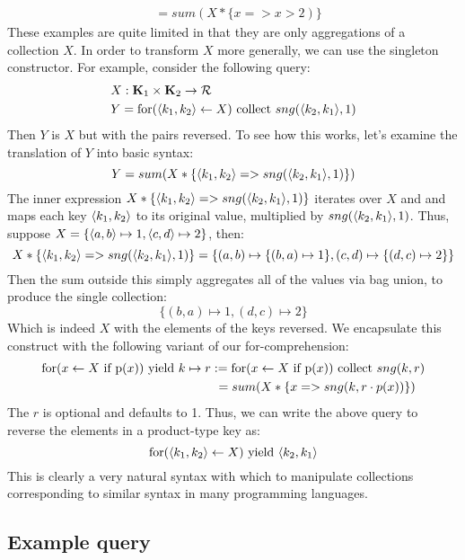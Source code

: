{{{{\begin{equation*}
\begin{split}
&=sum(X * \{x => x > 2) \}
\end{split}
\end{equation*}
These examples are quite limited in that they are only aggregations of a collection $X$. In order to transform $X$ more generally, we can use the singleton constructor. For example, consider the following query:
\begin{equation*}
\begin{split}
&X: \mathbf{K}_1 \times \mathbf{K}_2 \rightarrow \mathcal{R} \\
&Y = \textrm{for}(\langle k_1, k_2 \rangle \leftarrow X) \textrm{ collect } sng(\langle k_2, k_1 \rangle, 1)
\end{split}
\end{equation*}
Then $Y$ is $X$ but with the pairs reversed. To see how this works, let's examine the translation of $Y$ into basic syntax: 
\[ Y = sum(X*\{\langle k_1, k_2 \rangle => sng(\langle k_2, k_1 \rangle,1)\}) \]
The inner expression $X*\{\langle k_1, k_2 \rangle => sng(\langle k_2, k_1 \rangle,1)\}$ iterates over $X$ and and maps each key $\langle k_1, k_2 \rangle$ to its original value, multiplied by $sng(\langle k_2, k_1 \rangle,1)$. Thus, suppose $X = \{\langle a, b \rangle \mapsto 1, \langle c, d \rangle \mapsto 2\}$, then:
\begin{equation*}
X*\{\langle k_1, k_2 \rangle => sng(\langle k_2, k_1 \rangle,1)\} = \{(a,b) \mapsto \{(b,a) \mapsto 1\}, (c,d) \mapsto \{(d,c) \mapsto 2\}\}
\end{equation*}
Then the sum outside this simply aggregates all of the values via bag union, to produce the single collection:
\begin{equation*}
\{(b,a) \mapsto 1, (d,c) \mapsto 2\}
\end{equation*}
Which is indeed $X$ with the elements of the keys reversed. We encapsulate this construct with the following variant of our for-comprehension: 
\begin{equation*}
\begin{split}
\textrm{for}(x \leftarrow X \textrm{ if p}(x)) \textrm{ yield } k \mapsto r &:= \textrm{for}(x \leftarrow X \textrm{ if p}(x)) \textrm{ collect } sng(k,r) \\
& \ = sum(X * \{x => sng(k,r \cdot p(x)) \})
\end{split}
\end{equation*}
The $r$ is optional and defaults to 1. Thus, we can write the above query to reverse the elements in a product-type key as:
\[\textrm{for}(\langle k_1, k_2 \rangle \leftarrow X) \textrm{ yield } \langle k_2, k_1 \rangle\]
This is clearly a very natural syntax with which to manipulate collections corresponding to similar syntax in many programming languages.

\subsection{Example query} \label{examplequery}

}}}}
